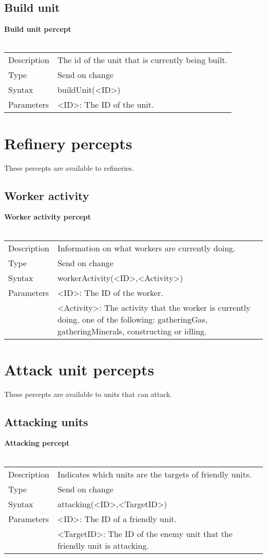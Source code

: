 \documentclass[english,11pt]{report}
\begin{document}
\subsection{Build unit}
\textbf{Build unit percept}\\
\\
\begin{tabularx}{\textwidth}{lX}
 Description & The id of the unit that is currently being built. \\
 Type & Send on change \\
 Syntax & buildUnit(<ID>) \\
 Parameters &   <ID>: The ID of the unit.
\end{tabularx}

\newpage
\section{Refinery percepts}
These percepts are available to refineries.

\subsection{Worker activity}
\textbf{Worker activity percept}\\
\\
\begin{tabularx}{\textwidth}{lX}
 Description & Information on what workers are currently doing. \\
 Type & Send on change \\
 Syntax & workerActivity(<ID>,<Activity>) \\
 Parameters &   <ID>: The ID of the worker.\\
            &   <Activity>: The activity that the worker is currently doing, one of the following: gatheringGas, gatheringMinerals, constructing or idling.
\end{tabularx}

\newpage
\section{Attack unit percepts}
These percepts are available to units that can attack.

\subsection{Attacking units}
\textbf{Attacking percept}\\
\\
\begin{tabularx}{\textwidth}{lX}
 Description & Indicates which units are the targets of friendly units. \\
 Type & Send on change \\
 Syntax & attacking(<ID>,<TargetID>) \\
 Parameters &   <ID>: The ID of a friendly unit.\\
            &   <TargetID>: The ID of the enemy unit that the friendly unit is attacking.
\end{tabularx}
\end{document}
